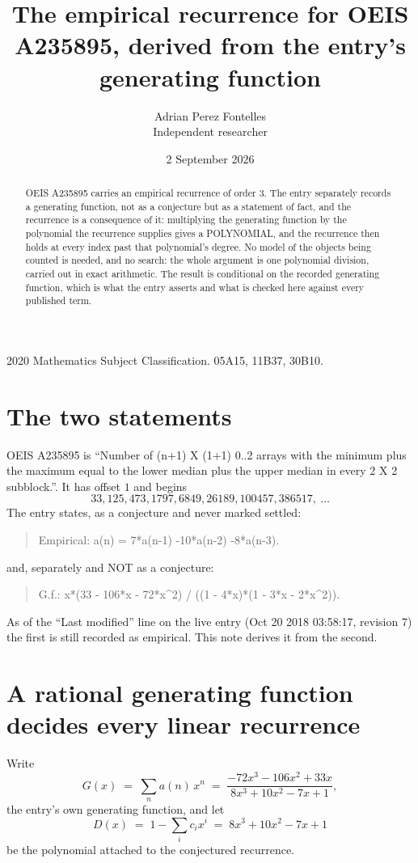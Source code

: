 \documentclass[11pt,a4paper]{article}
\title{The empirical recurrence for OEIS A235895, derived from the entry's generating function}
\author{Adrian Perez Fontelles\\ \small Independent researcher}
\date{2 September 2026}
\theoremstyle{plain}
\theoremstyle{definition}
\begin{document}
\maketitle

\begin{abstract}
OEIS A235895 carries an empirical recurrence of order $3$. The entry separately records a
generating function, not as a conjecture but as a statement of fact, and the recurrence is a
consequence of it: multiplying the generating function by the polynomial the recurrence
supplies gives a POLYNOMIAL, and the recurrence then holds at every index past that
polynomial's degree. No model of the objects being counted is needed, and no search: the
whole argument is one polynomial division, carried out in exact arithmetic. The result is
conditional on the recorded generating function, which is what the entry asserts and what is
checked here against every published term.
\end{abstract}

\noindent\small 2020 Mathematics Subject Classification. 05A15, 11B37, 30B10.\normalsize

\section{The two statements}

OEIS A235895 is ``Number of (n+1) X (1+1) 0..2 arrays with the minimum plus the maximum equal to the lower median plus the upper median in every 2 X 2 subblock.''. It has offset $1$ and begins
\[
33, 125, 473, 1797, 6849, 26189, 100457, 386517,\ \dots
\]
The entry states, as a conjecture and never marked settled:
\begin{quote}
Empirical: a(n) = 7*a(n-1) -10*a(n-2) -8*a(n-3).
\end{quote}
and, separately and NOT as a conjecture:
\begin{quote}
G.f.: x*(33 - 106*x - 72*x\^{}2) / ((1 - 4*x)*(1 - 3*x - 2*x\^{}2)).
\end{quote}
As of the ``Last modified'' line on the live entry (Oct 20 2018 03:58:17, revision 7) the first is still
recorded as empirical. This note derives it from the second.

\section{A rational generating function decides every linear recurrence}

Write
\[
G(x)\;=\;\sum_{n}a(n)\,x^{n}\;=\;\frac{- 72 x^{3} - 106 x^{2} + 33 x}{8 x^{3} + 10 x^{2} - 7 x + 1},
\]
the entry's own generating function, and let
\[
D(x)\;=\;1-\sum_i c_i x^{i}\;=\;8 x^{3} + 10 x^{2} - 7 x + 1
\]
be the polynomial attached to the conjectured recurrence.
\end{document}
